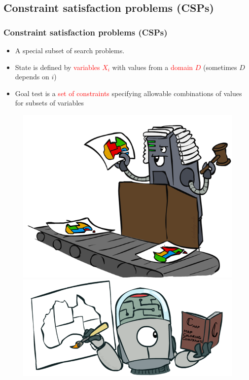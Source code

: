 \documentclass[
	11pt,
]{beamer}
\begin{document}
\subsection{Constraint satisfaction problems (CSPs)}
\begin{frame}
    \frametitle{Constraint satisfaction problems (CSPs)}

    \begin{itemize}
        \item A special subset of search problems.
        \bigskip
        \item State is defined by \textcolor{red}{variables \textbf{$X_i$}}  with values from a \textcolor{red}{domain \textbf{$D$}} (sometimes \textbf{$D$} depends on \textbf{$i$})
        \bigskip
        \item Goal test is a \textcolor{red}{set of constraints} specifying allowable combinations of values for subsets of variables
        \bigskip
    \end{itemize}
    \begin{figure}
        \centering
        \begin{minipage}{.5\textwidth}
          \centering
          \includegraphics[scale=0.2]{Figs/csp_1.png}
        \end{minipage}%
        \begin{minipage}{.5\textwidth}
          \centering
          \includegraphics[scale=0.2]{Figs/csp_2.png}
        \end{minipage}
        \end{figure}
\end{frame}
\end{document}
